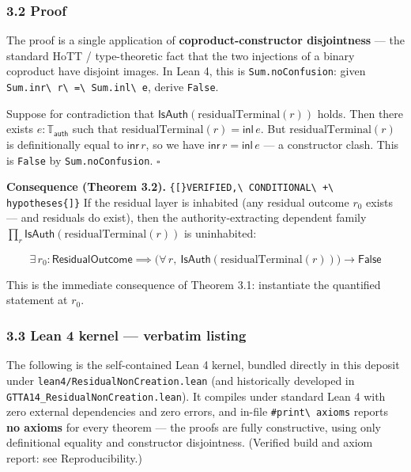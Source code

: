 \documentclass[
  10pt,
]{article}
\DeclareRobustCommand{\texttt}[1]{{\paperSymbolFont\nolinkurl{#1}}}
\begin{document}
\subsubsection{3.2 Proof}\label{proof}

The proof is a single application of \textbf{coproduct-constructor disjointness} --- the standard HoTT / type-theoretic fact that the two injections of a binary coproduct have disjoint images. In Lean 4, this is \texttt{Sum.noConfusion}: given \texttt{Sum.inr\ r\ =\ Sum.inl\ e}, derive \texttt{False}.

Suppose for contradiction that \protect\hypertarget{math-E0048-0065}{}{\(\mathsf{IsAuth}(\mathrm{residualTerminal}(r))\)} holds. Then there exists \protect\hypertarget{math-E0049-0066}{}{\(e : \mathbb{T}_{\mathsf{auth}}\)} such that \protect\hypertarget{math-E0050-0067}{}{\(\mathrm{residualTerminal}(r) = \mathsf{inl}\,e\)}. But \protect\hypertarget{math-E0051-0068}{}{\(\mathrm{residualTerminal}(r)\)} is definitionally equal to \protect\hypertarget{math-E0052-0069}{}{\(\mathsf{inr}\,r\)}, so we have \protect\hypertarget{math-E0053-0070}{}{\(\mathsf{inr}\,r = \mathsf{inl}\,e\)} --- a constructor clash. This is \texttt{False} by \texttt{Sum.noConfusion}. \protect\hypertarget{math-E0054-0071}{}{\(\square\)}

\textbf{Consequence (Theorem 3.2).} \texttt{{[}VERIFIED,\ CONDITIONAL\ +\ hypotheses{]}} If the residual layer is inhabited (any residual outcome \protect\hypertarget{math-E0055-0072}{}{\(r_0\)} exists --- and residuals do exist), then the authority-extracting dependent family \protect\hypertarget{math-E0056-0073}{}{\(\prod_r \mathsf{IsAuth}(\mathrm{residualTerminal}(r))\)} is uninhabited:

\protect\hypertarget{math-E0057-0074}{}{\[\exists\, r_0 : \mathsf{ResidualOutcome} \implies \Big(\forall\, r,\ \mathsf{IsAuth}(\mathrm{residualTerminal}(r))\Big) \to \mathsf{False}\]}

This is the immediate consequence of Theorem 3.1: instantiate the quantified statement at \protect\hypertarget{math-E0055-0075}{}{\(r_0\)}.

\subsubsection{3.3 Lean 4 kernel --- verbatim listing}\label{lean-4-kernel-verbatim-listing}

The following is the self-contained Lean 4 kernel, bundled directly in this deposit under \texttt{lean4/ResidualNonCreation.lean} (and historically developed in \texttt{GTTA14\_ResidualNonCreation.lean}). It compiles under standard Lean 4 with zero external dependencies and zero errors, and in-file \texttt{\#print\ axioms} reports \textbf{no axioms} for every theorem --- the proofs are fully constructive, using only definitional equality and constructor disjointness. (Verified build and axiom report: see Reproducibility.)
\end{document}
